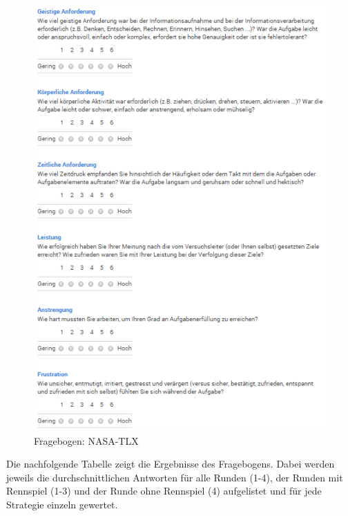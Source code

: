 \documentclass[12pt,a4paper]{scrartcl}
\begin{document}
\begin{figure}[H]
\begin{center}
\includegraphics[width=12cm]{nasa.png}
\caption{Fragebogen: NASA-TLX}
\label{fbnasatlx1}
\end{center}
\end{figure}

Die nachfolgende Tabelle zeigt die Ergebnisse des Fragebogens. Dabei werden jeweils die durchschnittlichen Antworten für alle Runden (1-4), der Runden mit Rennspiel (1-3) und der Runde ohne Rennspiel (4) aufgelistet und für jede Strategie einzeln gewertet. 

\newpage
\end{document}
